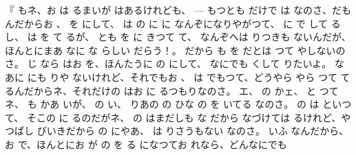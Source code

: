 『
もネ、お
は
るまいが
はあるけれども、 --- もつとも
だけで
は
なのさ、だもんだからお
、
を
にして、
は
の
に
に
なんぞになりやがつて、
に
で
して
るし、
は
を
て
るが、
とも
を
に
きつて
て、
なんぞへは
りつきも
ないんだが、ほんとにまあ
なに
な
らしい
だらう！。
だから
も
を
だとは
つて
やしないのさ。
じ
なら
はお
を、ほんたうに
の
にして、
なにでも
くして
りたいよ。
なあに
にも
りや
ないけれど、それでもお
、
は
でもつて、どうやら
やら
つて
て
るんだからネ、それだけの
はお
に
るつもりなのさ。
エ、
の
かェ、
と
つてネ、
も
かあ
いが、
の
い、
りあの
の
ひな
の
を
いてる
なのさ。
の
は
といつて、
そこの
に
るのだがネ、
の
はまだしも
な
だから
なづけては
るけれど、やつぱし
びいきだから
の
にやあ、
は
りさうもない
なのさ。
いふ
なんだから、お
で、ほんとにお
が
の
を
る
になつてお
れなら、どんなにでも
